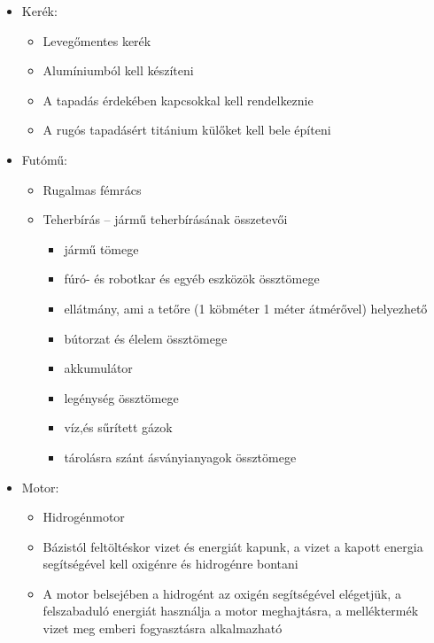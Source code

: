 \documentclass[12pt]{report}
\begin{document}
\begin{itemize}
    \item {} Kerék: 
        \begin{itemize}
            \item {} Levegőmentes kerék
            \item {} Alumíniumból kell készíteni
            \item {} A tapadás érdekében kapcsokkal kell rendelkeznie
            \item {} A rugós tapadásért titánium külőket kell bele építeni
        \end{itemize}
    \item {} Futómű:
        \begin{itemize}
            \item {} Rugalmas fémrács
            \item {} Teherbírás -- jármű teherbírásának összetevői
                \begin{itemize}
                    \item jármű tömege
                    \item fúró- és robotkar és egyéb eszközök össztömege
                    \item ellátmány, ami a tetőre (1 köbméter 1 méter átmérővel) helyezhető
                    \item bútorzat és élelem össztömege
                    \item akkumulátor
                    \item legénység össztömege
                    \item víz,és sűrített gázok
                    \item tárolásra szánt ásványianyagok össztömege
                \end{itemize}
        \end{itemize}
    \item {} Motor:
        \begin{itemize}
            \item Hidrogénmotor
            \item Bázistól feltöltéskor vizet és energiát kapunk, a vizet a kapott energia segítségével kell oxigénre és hidrogénre bontani
            \item A motor belsejében a hidrogént az oxigén segítségével elégetjük, a felszabaduló energiát használja a motor meghajtásra, a melléktermék vizet meg emberi fogyasztásra alkalmazható

\end{itemize}
\end{itemize}
\end{document}
